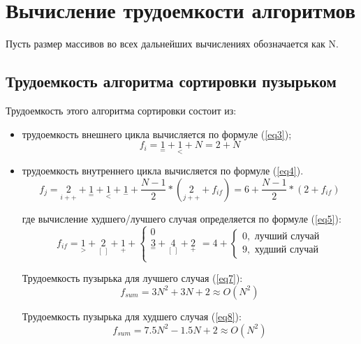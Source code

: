 \section{Вычисление трудоемкости алгоритмов}
Пусть размер массивов во всех дальнейших вычислениях обозначается как N.
\subsection{Трудоемкость алгоритма сортировки пузырьком}
Трудоемкость этого алгоритма сортировки состоит из:

\begin{itemize}
	\item трудоемкость внешнего цикла вычисляется по формуле (\ref{eq3});
	\begin{equation}
		\label{eq3} 
		f_{i} = {\underset{=}{1}} + {\underset{<}{1}} + N= 2 + N
	\end{equation}
	
	\item трудоемкость внутреннего цикла вычисляется по формуле (\ref{eq4}).
	\begin{equation}
		\label{eq4} 
		f_{j} = {\underset{i++}{2}} + {\underset{=}{1}} + {\underset{<}{1}} + {\underset{-}{1}} +
		\frac{N-1}{2}*({\underset{j++}{2}} + f_{if}) = 6 + \frac{N-1}{2}*(2 + f_{if})
	\end{equation}
	
	где вычисление худшего/лучшего случая определяется по формуле (\ref{eq5}):
	\begin{equation}
		\label{eq5}
		f_{if} = {\underset{>}{1}} + {\underset{[\ ]}{2}} + {\underset{+}{1}} +
		\begin{cases}
			0\\
			{\underset{=}{3}} + {\underset{[\ ]}{4}} +{\underset{+}{2}}\\
		\end{cases}
		= 4 +
		\begin{cases}
			0, \text{  лучший случай}\\
			9, \text{  худший случай}
		\end{cases}
	\end{equation}
	
	Трудоемкость пузырька для лучшего случая (\ref{eq7}):
	\begin{equation}
		\label{eq7}
		f_{sum} = 3N^2 + 3N + 2 \approx O(N^2)
	\end{equation}
	
	Трудоемкость пузырька для худшего случая (\ref{eq8}):
	\begin{equation}
		\label{eq8}
		f_{sum} = 7.5N^2 - 1.5N + 2 \approx O(N^2)
	\end{equation}
	
\end{itemize}
